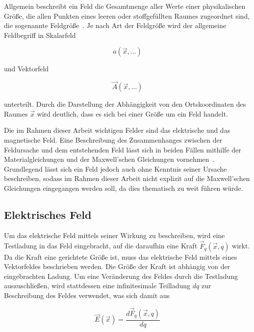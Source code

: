 
Allgemein beschreibt ein Feld die Gesamtmenge aller Werte einer physikalischen Größe, die allen Punkten eines leeren oder stoffgefüllten Raumes zugeordnet sind, die sogenannte Feldgröße~\cite{Spektrum.de_Feld}. Je nach Art der Feldgröße wird der allgemeine Feldbegriff in Skalarfeld 

\begin{equation}
    a(\vec x, \ldots)    
\end{equation}


und Vektorfeld 

\begin{equation}
    \vec A(\vec x,\ldots)
\end{equation}

unterteilt. Durch die Darstellung der Abhängigkeit von den Ortskoordinaten des Raumes $\vec x$ wird deutlich, dass es sich bei einer Größe um ein Feld handelt. \par
\vspace{\linespace}
Die im Rahmen dieser Arbeit wichtigen Felder sind das elektrische und das magnetische Feld. Eine Beschreibung des Zusammenhanges zwischen der Feldursache und dem entstehenden Feld lässt sich in beiden Fällen mithilfe der Materialgleichungen und der Maxwell'schen Gleichungen vornehmen~\cite{EM_Schirmung}. Grundlegend lässt sich ein Feld jedoch auch ohne Kenntnis seiner Ursache beschreiben, sodass im Rahmen dieser Arbeit nicht explizit auf die Maxwell'schen Gleichungen eingegangen werden soll, da dies thematisch zu weit führen würde. 


\subsection{Elektrisches Feld}\label{cha:2_sub_Elektrisches_Feld}

Um das elektrische Feld mittels seiner Wirkung zu beschreiben, wird eine Testladung in das Feld eingebracht, auf die daraufhin eine Kraft $\vec F_q(\vec x,q)$ wirkt. Da die Kraft eine gerichtete Größe ist, muss das elektrische Feld mittels eines Vektorfeldes beschrieben werden. Die Größe der Kraft ist abhängig von der eingebrachten Ladung. Um eine Veränderung des Feldes durch die Testladung auszuschließen, wird stattdessen eine infinitesimale Teilladung $dq$ zur Beschreibung des Feldes verwendet, was sich damit aus

\begin{equation}
    \vec E (\vec x) = \frac{d\vec F_q(\vec x,q)}{dq}
\end{equation}

